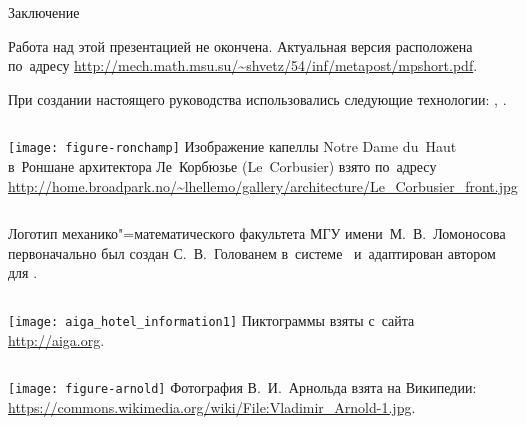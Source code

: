 \begin{frame}{Заключение}

\begin{footnotesize}

Работа над этой презентацией не окончена. Актуальная версия расположена по~адресу
\url{http://mech.math.msu.su/~shvetz/54/inf/metapost/mpshort.pdf}.

При создании настоящего руководства использовались следующие технологии:
, .

\bigskip

\begin{columns}
\centering
\texttt{[image: figure-ronchamp]}
Изображение капеллы \textfrench{Notre Dame du~Haut} в~Роншане архитектора
Ле~Корбюзье (Le~Corbusier) взято по~адресу
\url{http://home.broadpark.no/~lhellemo/gallery/architecture/Le_Corbusier_front.jpg}
\end{columns}

\medskip

\begin{columns}
\centering
{}
Логотип механико"=математического факультета МГУ имени М.~В.~Ломоносова
первоначально был создан С.~В.~Голованем в~системе~
и~адаптирован автором для .
\end{columns}

\medskip

\begin{columns}
\centering
\texttt{[image: aiga\_hotel\_information1]}
Пиктограммы взяты с~сайта \url{http://aiga.org}.
\end{columns}

\medskip

\begin{columns}
\centering
\texttt{[image: figure-arnold]}
Фотография В.~И.~Арнольда взята на Википедии:
\url{https://commons.wikimedia.org/wiki/File:Vladimir_Arnold-1.jpg}.
\end{columns}

\end{footnotesize}
\end{frame}


